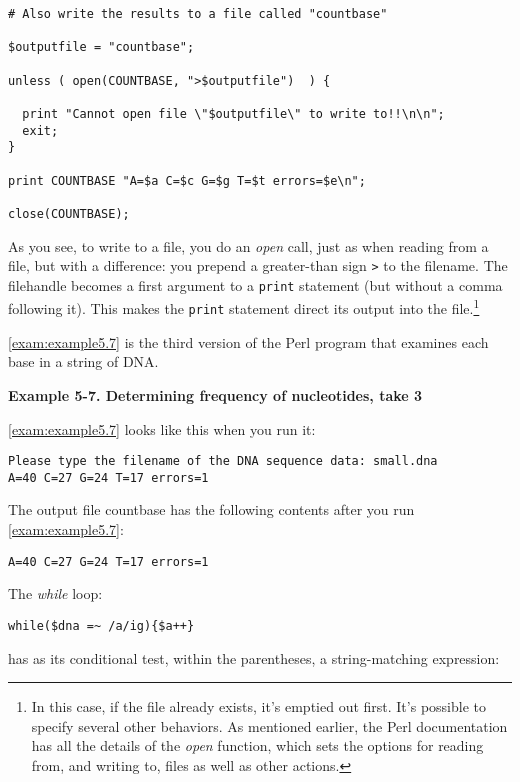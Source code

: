 \begin{lstlisting}
# Also write the results to a file called "countbase"

$outputfile = "countbase";

unless ( open(COUNTBASE, ">$outputfile")  ) {

  print "Cannot open file \"$outputfile\" to write to!!\n\n";
  exit;
}

print COUNTBASE "A=$a C=$c G=$g T=$t errors=$e\n";

close(COUNTBASE);
\end{lstlisting}

As you see, to write to a file, you do an \textit{open} call, just as when reading from a file, but with a difference: you prepend a greater-than sign \verb|>| to the filename. The filehandle becomes a first argument to a \verb|print| statement (but without a comma following it). This makes the \verb|print| statement direct its output into the file.\footnote{In this case, if the file already exists, it's emptied out first. It's possible to specify several other behaviors. As mentioned earlier, the Perl documentation has all the details of the \textit{open} function, which sets the options for reading from, and writing to, files as well as other actions.}

\autoref{exam:example5.7} is the third version of the Perl program that examines each base in a string of DNA. 

\textbf{Example 5-7. Determining frequency of nucleotides, take 3}


\autoref{exam:example5.7} looks like this when you run it:

\begin{lstlisting}
Please type the filename of the DNA sequence data: small.dna
A=40 C=27 G=24 T=17 errors=1
\end{lstlisting}

The output file countbase has the following contents after you run \autoref{exam:example5.7}:

\begin{lstlisting}
A=40 C=27 G=24 T=17 errors=1
\end{lstlisting}

The \textit{while} loop:

\begin{lstlisting}
while($dna =~ /a/ig){$a++} 
\end{lstlisting}

has as its conditional test, within the parentheses, a string-matching expression:

